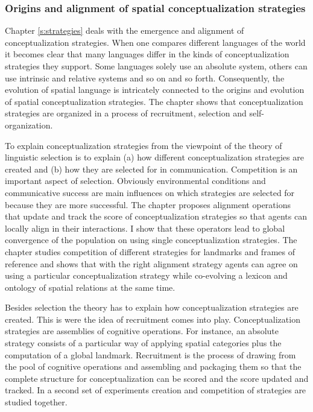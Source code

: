 \subsubsection{Origins and alignment of spatial conceptualization strategies}
Chapter \ref{s:strategies} deals with the emergence and 
alignment of conceptualization strategies.
When one compares different languages of the world it becomes clear that many languages 
differ in the kinds of conceptualization strategies they support. Some languages 
solely use an absolute system, others can use intrinsic and relative systems and so on
and so forth. Consequently, the evolution of spatial language is intricately connected to the 
origins and evolution of spatial conceptualization strategies. The chapter shows that
conceptualization strategies are organized in a process of recruitment, selection and 
self-organization. 

To explain conceptualization strategies from the viewpoint of the theory of linguistic
selection is to explain (a) how different conceptualization strategies are created
and (b) how they are selected for in communication. Competition is an important aspect
of selection. Obviously environmental conditions and communicative success 
are main influences on which strategies are selected for because they are more successful. 
The chapter proposes alignment operations that update and track the score
of conceptualization strategies so that agents can locally align in their
interactions. I show that these operators lead to global convergence
of the population on using single conceptualization strategies.
The chapter studies competition of different strategies for landmarks and 
frames of reference and shows that with the right alignment strategy
agents can agree on using a particular conceptualization strategy while
co-evolving a lexicon and ontology of spatial relations at the same time.

Besides selection the theory has to explain how conceptualization
strategies are created. This is were the idea of recruitment comes into play.
Conceptualization strategies are assemblies of cognitive operations. For instance,
an absolute strategy consists of a particular way of applying spatial categories
plus the computation of a global landmark. Recruitment is the process
of drawing from the pool of cognitive operations and assembling and packaging
them so that the complete structure for conceptualization can be scored and 
the score updated and tracked. In a second set of experiments creation
and competition of strategies are studied together.

